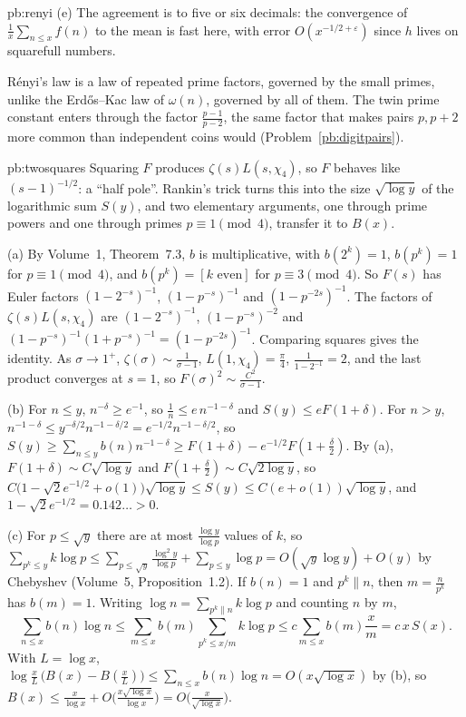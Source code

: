 \begin{solution}{pb:renyi}
(e) The agreement is to five or six decimals: the convergence of $\frac1x\sum_{n\le x}f(n)$ to the mean is fast here, with error $O(x^{-1/2+\varepsilon})$ since $h$ lives on squarefull numbers.

\leads R\'enyi's law is a law of repeated prime factors, governed by the small primes, unlike the Erd\H os--Kac law of $\omega(n)$, governed by all of them. The twin prime constant enters
through the factor $\frac{p-1}{p-2}$, the same factor that makes pairs $p,p+2$ more common than independent coins would (Problem~\ref{pb:digitpairs}).
\end{solution}

\begin{solution}{pb:twosquares}
\idea Squaring $F$ produces $\zeta(s)L(s,\chi_4)$, so $F$ behaves like $(s-1)^{-1/2}$: a ``half pole''. Rankin's trick turns this into the size $\sqrt{\log y}$ of the logarithmic
sum $S(y)$, and two elementary arguments, one through prime powers and one through primes $p\equiv1\pmod4$, transfer it to $B(x)$.

\writeup (a) By Volume~1, Theorem~7.3, $b$ is multiplicative, with $b(2^k)=1$, $b(p^k)=1$ for $p\equiv1\pmod4$, and $b(p^k)=[k\text{ even}]$ for $p\equiv3\pmod4$. So $F(s)$ has Euler
factors $(1-2^{-s})^{-1}$, $(1-p^{-s})^{-1}$ and $(1-p^{-2s})^{-1}$. The factors of $\zeta(s)L(s,\chi_4)$ are $(1-2^{-s})^{-1}$, $(1-p^{-s})^{-2}$ and $(1-p^{-s})^{-1}(1+p^{-s})^{-1}=(1-p^{-2s})^{-1}$.
Comparing squares gives the identity. As $\sigma\to1^+$, $\zeta(\sigma)\sim\frac1{\sigma-1}$, $L(1,\chi_4)=\frac\pi4$, $\frac1{1-2^{-1}}=2$, and the last product converges at $s=1$, so
$F(\sigma)^2\sim\frac{C^2}{\sigma-1}$.

(b) For $n\le y$, $n^{-\delta}\ge e^{-1}$, so $\frac1n\le e\,n^{-1-\delta}$ and $S(y)\le eF(1+\delta)$. For $n>y$, $n^{-1-\delta}\le y^{-\delta/2}n^{-1-\delta/2}=e^{-1/2}n^{-1-\delta/2}$, so
$S(y)\ge\sum_{n\le y}b(n)n^{-1-\delta}\ge F(1+\delta)-e^{-1/2}F(1+\frac\delta2)$. By (a), $F(1+\delta)\sim C\sqrt{\log y}$ and $F(1+\frac\delta2)\sim C\sqrt{2\log y}$, so
$C\bigl(1-\sqrt2e^{-1/2}+o(1)\bigr)\sqrt{\log y}\le S(y)\le C(e+o(1))\sqrt{\log y}$, and $1-\sqrt2e^{-1/2}=0.142\ldots>0$.

(c) For $p\le\sqrt y$ there are at most $\frac{\log y}{\log p}$ values of $k$, so $\sum_{p^k\le y}k\log p\le\sum_{p\le\sqrt y}\frac{\log^2y}{\log p}+\sum_{p\le y}\log p=O(\sqrt y\log y)+O(y)$
by Chebyshev (Volume~5, Proposition~1.2). If $b(n)=1$ and $p^k\parallel n$, then $m=\frac n{p^k}$ has $b(m)=1$. Writing $\log n=\sum_{p^k\parallel n}k\log p$ and counting $n$ by $m$,
\[
\sum_{n\le x}b(n)\log n\le\sum_{m\le x}b(m)\sum_{p^k\le x/m}k\log p\le c\sum_{m\le x}b(m)\frac xm=c\,x\,S(x).
\]
With $L=\log x$, $\log\frac xL\,\bigl(B(x)-B(\frac xL)\bigr)\le\sum_{n\le x}b(n)\log n=O(x\sqrt{\log x})$ by (b), so $B(x)\le\frac x{\log x}+O\bigl(\frac{x\sqrt{\log x}}{\log x}\bigr)=O\bigl(\frac x{\sqrt{\log x}}\bigr)$.


\end{solution}
